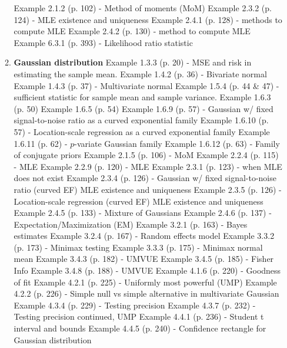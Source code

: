 \begin{enumerate}[label*=\textbf{\arabic*.}]
\begin{enumerate}[label*=\textbf{\arabic*.}]
  					\subitem Example 2.1.2 (p. 102) - Method of moments (MoM)
  					\subitem Example 2.3.2 (p. 124) - MLE existence and uniqueness
  					\subitem Example 2.4.1 (p. 128) - methods to compute MLE
  					\subitem Example 2.4.2 (p. 130) - method to compute MLE
  					\subitem Example 6.3.1 (p. 393) - Likelihood ratio statistic
  				\item \textbf{Gaussian distribution}
  					\subitem Example 1.3.3 (p. 20) - MSE and risk in estimating the sample mean.
	  				\subitem Example 1.4.2 (p. 36) - Bivariate normal
	  				\subitem Example 1.4.3 (p. 37) - Multivariate normal
  					\subitem Example 1.5.4 (p. 44 \& 47) - sufficient statistic for sample mean and sample variance.
  					\subitem Example 1.6.3 (p. 50)
  					\subitem Example 1.6.5 (p. 54)
  					\subitem Example 1.6.9 (p. 57) - Gaussian w/ fixed signal-to-noise ratio as a curved exponential family
	  				\subitem Example 1.6.10 (p. 57) - Location-scale regression as a curved exponential family
  					\subitem Example 1.6.11 (p. 62) - $p$-variate Gaussian family
  					\subitem Example 1.6.12 (p. 63) - Family of conjugate priors
  					\subitem Example 2.1.5 (p. 106) - MoM
  					\subitem Example 2.2.4 (p. 115) - MLE
  					\subitem Example 2.2.9 (p. 120) - MLE
  					\subitem Example 2.3.1 (p. 123) - when MLE does not exist
  					\subitem Example 2.3.4 (p. 126) - Gaussian w/ fixed signal-to-noise ratio (curved EF) MLE existence and uniqueness
  					\subitem Example 2.3.5 (p. 126) - Location-scale regression (curved EF) MLE existence and uniqueness
  					\subitem Example 2.4.5 (p. 133) - Mixture of Gaussians
  					\subitem Example 2.4.6 (p. 137) - Expectation/Maximization (EM)
  					\subitem Example 3.2.1 (p. 163) - Bayes estimates
  					\subitem Example 3.2.4 (p. 167) - Random effects model
  					\subitem Example 3.3.2 (p. 173) - Minimax testing
  					\subitem Example 3.3.3 (p. 175) - Minimax normal mean
  					\subitem Example 3.4.3 (p. 182) - UMVUE
  					\subitem Example 3.4.5 (p. 185) - Fisher Info
  					\subitem Example 3.4.8 (p. 188) - UMVUE
  					\subitem Example 4.1.6 (p. 220) - Goodness of fit
  					\subitem Example 4.2.1 (p. 225) - Uniformly most powerful (UMP)
  					\subitem Example 4.2.2 (p. 226) - Simple null vs simple alternative in multivariate Gaussian
	  				\subitem Example 4.3.4 (p. 229) - Testing precision
  					\subitem Example 4.3.7 (p. 232) - Testing precision continued, UMP
  					\subitem Example 4.4.1 (p. 236) - Student t interval and bounds
  					\subitem Example 4.4.5 (p. 240) - Confidence rectangle for Gaussian distribution

\end{enumerate}
\end{enumerate}
